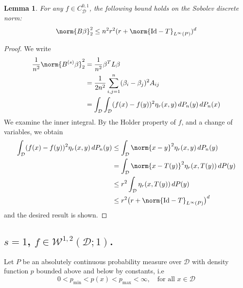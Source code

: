 \documentclass{article}
\newcommand{\1}{\mathbb{I}}
\newcommand{\D}{\mathcal{D}}
\theoremstyle{alden}
\theoremstyle{aldenthm}
\newtheorem{lemma}{Lemma}
\theoremstyle{definition}
\theoremstyle{remark}
\begin{document}
\begin{lemma}
	\label{lem:holder_1_bound}
	For any $f \in C_{\mathcal{D}}^{0,1}$, the following bound holds on the Sobolev discrete norm:
	\begin{equation*}
	\norm{B\beta}_2^2 \leq n^2r^2(r + \norm{\mathrm{Id} - T}_{L^{\infty}(P)})^d
	\end{equation*}
\end{lemma}
\begin{proof}
	We write
	\begin{align*}
	\frac{1}{n^2}\norm{B^{(s)}\beta}_2^2 & = \frac{1}{n^2} \beta^T L \beta \\
	& = \frac{1}{2n^2} \sum_{i,j = 1}^{n} (\beta_i - \beta_j)^2 A_{ij} \\
	& = \int_{\D} \int_{\D} (f(x) - f(y))^2 \eta_r(x,y) \,dP_n(y) \,dP_n(x)
	\end{align*}
	We examine the inner integral. By the Holder property of $f$, and a change of variables, we obtain
	\begin{align*}
	\int_{\D} (f(x) - f(y))^2 \eta_r(x,y) \,dP_n(y) & \leq \int_{\D} \norm{x - y}^2 \eta_r(x,y) \,dP_n(y) \\
	& = \int_{\D} \norm{x - T(y)}^2 \eta_r(x,T(y)) \,dP(y) \\
	& \leq r^2 \int_{\D} \eta_r(x,T(y)) \,dP(y) \\
	& \leq r^2 \bigl( r + \norm{\mathrm{Id} - T}_{L^{\infty}(P)} \bigr)^d
	\end{align*}
	and the desired result is shown.
\end{proof}

\subsection{$s = 1$, $f \in \mathcal{W}^{1,2}(\D; 1)$.}

Let $P$ be an absolutely continuous probability measure over $\D$ with density function $p$ bounded above and below by constants, i.e
\begin{equation*}
0 < p_{\textrm{min}} < p(x) < p_{\textrm{max}} < \infty, \quad \textrm{for all $x \in \mathcal{D}$}
\end{equation*}
\end{document}
